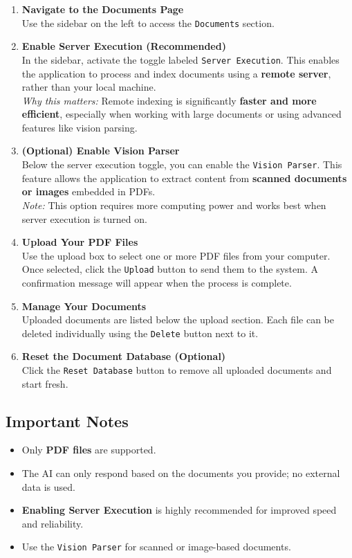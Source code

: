 \documentclass[11pt,a4paper]{report}
\begin{document}
\begin{enumerate}
    \item \textbf{Navigate to the Documents Page} \\
    Use the sidebar on the left to access the \texttt{Documents} section.

    \item \textbf{Enable Server Execution (Recommended)} \\
    In the sidebar, activate the toggle labeled \texttt{Server Execution}. This enables the application to process and index documents using a \textbf{remote server}, rather than your local machine. \\
    \textit{Why this matters:} Remote indexing is significantly \textbf{faster and more efficient}, especially when working with large documents or using advanced features like vision parsing.

    \item \textbf{(Optional) Enable Vision Parser} \\
    Below the server execution toggle, you can enable the \texttt{Vision Parser}. This feature allows the application to extract content from \textbf{scanned documents or images} embedded in PDFs. \\
    \textit{Note:} This option requires more computing power and works best when server execution is turned on.

    \item \textbf{Upload Your PDF Files} \\
    Use the upload box to select one or more PDF files from your computer. Once selected, click the \texttt{Upload} button to send them to the system. A confirmation message will appear when the process is complete.

    \item \textbf{Manage Your Documents} \\
    Uploaded documents are listed below the upload section. Each file can be deleted individually using the \texttt{Delete} button next to it.

    \item \textbf{Reset the Document Database (Optional)} \\
    Click the \texttt{Reset Database} button to remove all uploaded documents and start fresh.
\end{enumerate}

\subsection*{Important Notes}
\begin{itemize}
    \item Only \textbf{PDF files} are supported.
    \item The AI can only respond based on the documents you provide; no external data is used.
    \item \textbf{Enabling Server Execution} is highly recommended for improved speed and reliability.
    \item Use the \texttt{Vision Parser} for scanned or image-based documents.
\end{itemize}
\end{document}
